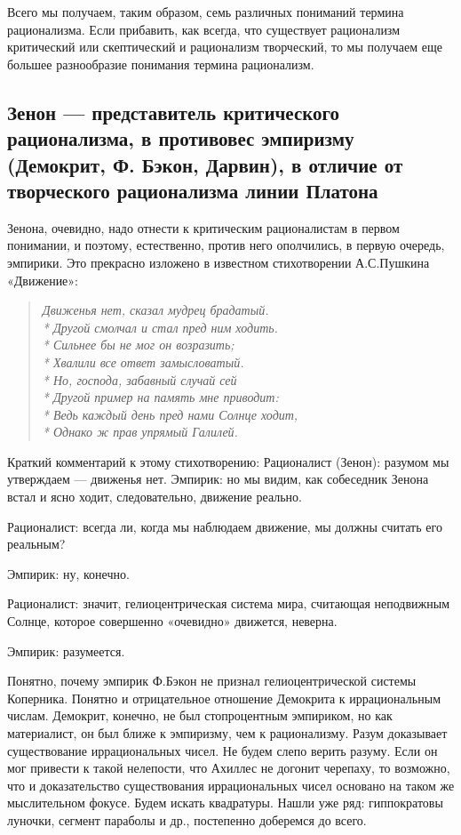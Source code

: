 Всего  мы получаем,  таким образом,  семь различных  пониманий термина
рационализма. Если  прибавить, как всегда, что  существует рационализм
критический или скептический и  рационализм творческий, то мы получаем
еще большее разнообразие понимания термина рационализм.

\subsection{Зенон  ---  представитель   критического  рационализма,  в
противовес  эмпиризму  (Демокрит,  Ф.  Бэкон, Дарвин),  в  отличие  от
творческого рационализма линии Платона}

Зенона, очевидно,  надо отнести  к критическим рационалистам  в первом
понимании, и  поэтому, естественно,  против него ополчились,  в первую
очередь, эмпирики.  Это прекрасно  изложено в  известном стихотворении
А.С.Пушкина «Движение»:

\begin{verse}

\emph{Движенья нет,  сказал мудрец брадатый.\\* Другой  смолчал и стал
пред ним  ходить.\\* Сильнее  бы не мог  он возразить;\\*  Хвалили все
ответ  замысловатый.\\* Но,  господа,  забавный  случай сей\\*  Другой
пример на  память мне приводит:\\*  Ведь каждый день пред  нами Солнце
ходит,\\* Однако ж прав упрямый Галилей.}

\end{verse}

Краткий  комментарий  к   этому  стихотворению:  Рационалист  (Зенон):
разумом  мы утверждаем  --- движенья  нет. Эмпирик:  но мы  видим, как
собеседник Зенона встал и ясно ходит, следовательно, движение реально.

Рационалист: всегда ли, когда мы наблюдаем движение, мы должны считать
его реальным?

Эмпирик: ну, конечно.

Рационалист:   значит,  гелиоцентрическая   система  мира,   считающая
неподвижным Солнце, которое совершенно «очевидно» движется, неверна.

Эмпирик: разумеется.

Понятно,   почему  эмпирик   Ф.Бэкон   не  признал   гелиоцентрической
системы  Коперника.  Понятно  и отрицательное  отношение  Демокрита  к
иррациональным  числам.   Демокрит,  конечно,  не   был  стопроцентным
эмпириком,  но  как материалист,  он  был  ближе  к эмпиризму,  чем  к
рационализму. Разум доказывает  существование иррациональных чисел. Не
будем слепо верить разуму. Если он мог привести к такой нелепости, что
Ахиллес  не  догонит  черепаху,  то  возможно,  что  и  доказательство
существования иррациональных  чисел основано на таком  же мыслительном
фокусе. Будем искать квадратуры.  Нашли уже ряд: гиппократовы луночки,
сегмент параболы и др., постепенно доберемся до всего.

